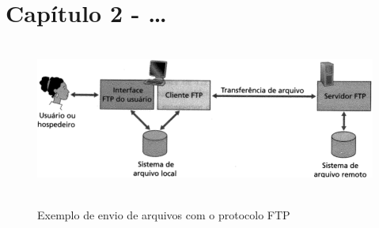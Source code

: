 \chapter{Capítulo 2 - \ldots}

\lipsum[5-6]

\begin{figure}[h]
\centering
\includegraphics[height=5cm]{figuras/figura1.png}
\caption{Exemplo de envio de arquivos com o protocolo FTP}
\label{fig:ftp}
\cite{james_f._kurose_redes_2005}
\end{figure}

\lipsum[7-8]